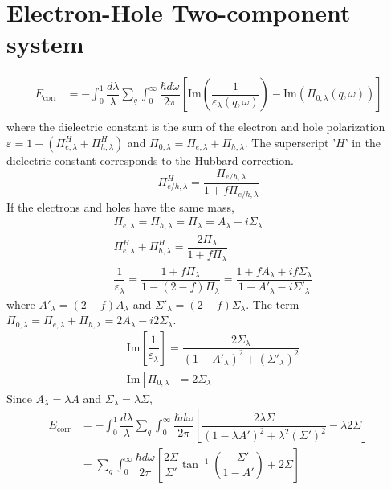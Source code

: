 \documentclass[aps,prb,onecolumn,notitlepage,showpacs,floatfix,superscriptaddress]{revtex4-1}
\begin{document}
\section{Electron-Hole Two-component system}
\begin{equation}
\begin{split}
E_{\mathrm{corr}}&=-\int_0^1\dfrac{d\lambda}{\lambda} \sum_{q} \int_{0}^{\infty} \dfrac{\hbar d\omega}{2\pi} \left[\mathrm{Im}\left( \dfrac{1}{\varepsilon_{\lambda}(q,\omega)} \right)- \mathrm{Im}\left(\Pi_{0,\lambda}(q,\omega) \right) \right] \\
\end{split}
\end{equation}
where the dielectric constant is the sum of the electron and hole polarization $\varepsilon=1-\left( \Pi_{e,\lambda}^H + \Pi_{h,\lambda}^H\right)$ and $\Pi_{0,\lambda}=\Pi_{e,\lambda}+\Pi_{h,\lambda}$. The superscript '$H$' in the dielectric constant corresponds to the Hubbard correction.
\begin{equation}
\Pi_{e/h,\lambda}^H = \dfrac{\Pi_{e/h,\lambda}}{1+f \Pi_{e/h,\lambda}}
\end{equation}
If the electrons and holes have the same mass, 
\begin{equation}
\begin{split}
&\Pi_{e,\lambda}=\Pi_{h,\lambda}=\Pi_{\lambda}=A_{\lambda}+i \Sigma_{\lambda} \\
& \Pi_{e,\lambda}^H + \Pi_{h,\lambda}^H = \dfrac{2 \Pi_{\lambda}}{1+f \Pi_{\lambda}} \\
& \dfrac{1}{\varepsilon_{\lambda}} = \dfrac{1+f \Pi_{\lambda}}{1-(2-f)\Pi_{\lambda}} = \dfrac{1+f A_{\lambda}+i f \Sigma_{\lambda}}{1- A'_{\lambda}-i \Sigma'_{\lambda}}
\end{split}
\end{equation}
where $A'_{\lambda}=(2-f)A_{\lambda}$ and $\Sigma'_{\lambda}=(2-f)\Sigma_{\lambda}$. The term $\Pi_{0,\lambda}=\Pi_{e,\lambda}+\Pi_{h,\lambda}=2 A_{\lambda}-i 2 \Sigma_{\lambda}$.
\begin{equation}
\begin{split}
& \mathrm{Im}\left[\dfrac{1}{\varepsilon_{\lambda}} \right] = \dfrac{2 \Sigma_{\lambda}}{(1-A'_{\lambda})^2+(\Sigma'_{\lambda})^2} \\
& \mathrm{Im}\left[\Pi_{0,\lambda} \right] = 2 \Sigma_{\lambda}
\end{split}
\end{equation}
Since $A_{\lambda}=\lambda A$ and $\Sigma_{\lambda}=\lambda \Sigma$,
\begin{equation}
\begin{split}
E_{\mathrm{corr}}&=-\int_0^1\dfrac{d\lambda}{\lambda} \sum_{q} \int_{0}^{\infty} \dfrac{\hbar d\omega}{2\pi} \left[ \dfrac{2\lambda \Sigma}{(1-\lambda A')^2+\lambda^2 (\Sigma')^2} - \lambda 2 \Sigma \right] \\
&=\sum_{q} \int_{0}^{\infty} \dfrac{\hbar d\omega}{2\pi} \left[ \dfrac{2\Sigma}{\Sigma'} \tan^{-1} \left(\dfrac{-\Sigma'}{1-A'} \right)+ 2 \Sigma \right] 
\end{split}
\end{equation}
\end{document}

